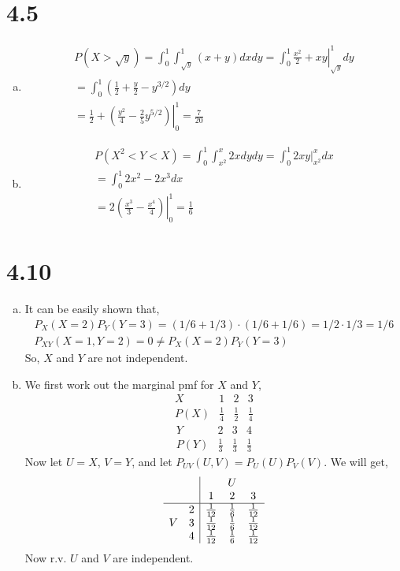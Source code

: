 \documentclass[letterpaper]{article}
\begin{document}
    \section*{4.5}
    \begin{enumerate}[(a)]
    \item
    \begin{eqnarray*}
        P(X > \sqrt{y}) = \int_0^1 \int_{\sqrt y}^1 (x+y) dx dy = \int_0^1 \left. \frac{x^2}{2} + xy \right|^1_{\sqrt y} dy\\
        = \int_0^1 (\frac{1}{2} + \frac{y}{2} - y^{3/2}) dy \\
        = \frac{1}{2} + \left. \left(\frac{y^2}{4} - \frac{2}{5} y^{5/2} \right) \right|^1_0 = \frac{7}{20}
    \end{eqnarray*}
    \item
    \begin{eqnarray*}
        P(X^2 < Y < X) = \int_0^1 \int_{x^2}^x 2x dy dy = \int_0^1 \left. 2xy \right|^x_{x^2} dx\\
        = \int_0^1 2x^2 - 2x^3 dx \\
        = \left. 2 \left(\frac{x^3}{3} - \frac{x^4}{4} \right) \right|^1_0 = \frac{1}{6}
    \end{eqnarray*}
    \end{enumerate}
    \section*{4.10}
    \begin{enumerate}[(a)]
    \item
    It can be easily shown that,
    \begin{eqnarray*}
    P_X(X=2)P_Y(Y=3) = (1/6 + 1/3) \cdot (1/6 + 1/6) = 1/2 \cdot 1/3 = 1/6\\
    P_{XY}(X=1, Y=2) = 0 \neq P_X(X=2) P_Y(Y=3)
    \end{eqnarray*}
    So, $X$ and $Y$ are not independent.
    \item
    We first work out the marginal pmf for $X$ and $Y$, 
    \[
    \begin{array}{c|ccc}
    X & 1 & 2 & 3\\
    \hline
    P(X) & \frac{1}{4} & \frac{1}{2} & \frac{1}{4}
    \end{array}
    \]
    \[
    \begin{array}{c|ccc}
    Y & 2 & 3 & 4\\
    \hline
    P(Y) & \frac{1}{3} & \frac{1}{3} & \frac{1}{3}
    \end{array}
    \]
    Now let $U=X$, $V=Y$, and let $P_{UV}(U, V) = P_U(U) P_V(V)$. We will get,
    \[
    \begin{array}{cc|ccc}
    & & & U & \\
    & & 1 & 2 & 3 \\
    \hline
    & 2 & \frac{1}{12} & \frac{1}{6} & \frac{1}{12} \\
    V & 3 & \frac{1}{12} & \frac{1}{6} & \frac{1}{12} \\
    & 4 & \frac{1}{12} & \frac{1}{6} & \frac{1}{12} \\
    \end{array}
    \]
    Now r.v. $U$ and $V$ are independent.
    \end{enumerate}
\end{document}
